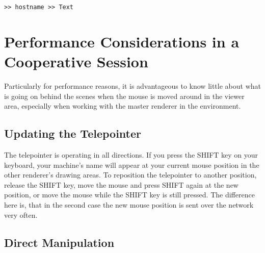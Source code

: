 \begin{verbatim}
>> hostname >> Text
\end{verbatim}

\section{Performance Considerations in a Cooperative Session}
\label{Performance}
Particularly for performance reasons, it is advantageous to know little
about what is going on behind the scenes when the mouse is moved around
in the viewer area, especially when working with the master renderer in
the environment.

\subsection{Updating the Telepointer}

The telepointer is operating in all directions. If you press the SHIFT
key on your keyboard, your machine's name will appear at your current
mouse position in the other renderer's drawing areas. To reposition the
telepointer to another position, release the SHIFT key, move the mouse
and press SHIFT again at the new position, or move the mouse while the
SHIFT key is still pressed. The difference here is, that in the second
case the new mouse position is sent over the network very often.

%


    
\subsection{Direct Manipulation}

